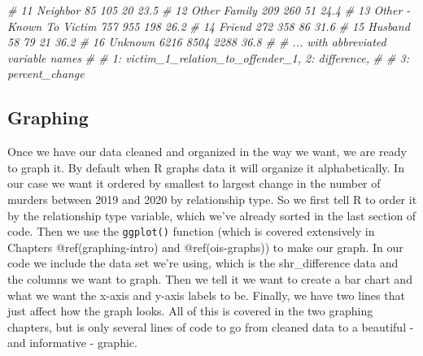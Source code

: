 \documentclass[
  a4paper,
]{krantz}
\makeatletter
\newenvironment{Shaded}{\begin{snugshade}}{\end{snugshade}}
\newcommand{\CommentTok}[1]{\textcolor[rgb]{0.56,0.35,0.01}{\textit{#1}}}
\newenvironment{kframe}{%
\medskip{}
\setlength{\fboxsep}{.8em}
 \def\at@end@of@kframe{}%
 \ifinner\ifhmode%
  \def\at@end@of@kframe{\end{minipage}}%
  \begin{minipage}{\columnwidth}%
 \fi\fi%
 \def\FrameCommand##1{\hskip\@totalleftmargin \hskip-\fboxsep
 \colorbox{shadecolor}{##1}\hskip-\fboxsep
     \hskip-\linewidth \hskip-\@totalleftmargin \hskip\columnwidth}%
 \MakeFramed {\advance\hsize-\width
   \@totalleftmargin\z@ \linewidth\hsize
   \@setminipage}}%
 {\par\unskip\endMakeFramed%
 \at@end@of@kframe}
\renewenvironment{Shaded}{\begin{kframe}}{\end{kframe}}
\makeatother
\begin{document}
\begin{Shaded}
\begin{Highlighting}[]
\CommentTok{\# 11 Neighbor                        85    105      20   23.5 }
\CommentTok{\# 12 Other Family                   209    260      51   24.4 }
\CommentTok{\# 13 Other {-} Known To Victim        757    955     198   26.2 }
\CommentTok{\# 14 Friend                         272    358      86   31.6 }
\CommentTok{\# 15 Husband                         58     79      21   36.2 }
\CommentTok{\# 16 Unknown                       6216   8504    2288   36.8 }
\CommentTok{\# \# ... with abbreviated variable names}
\CommentTok{\# \#   1: victim\_1\_relation\_to\_offender\_1, 2: difference,}
\CommentTok{\# \#   3: percent\_change}
\end{Highlighting}
\end{Shaded}

\hypertarget{graphing}{%
\subsection{Graphing}\label{graphing}}

Once we have our data cleaned and organized in the way we
want, we are ready to graph it. By default when R graphs
data it will organize it alphabetically. In our case we want
it ordered by smallest to largest change in the number of
murders between 2019 and 2020 by relationship type. So we
first tell R to order it by the relationship type variable,
which we've already sorted in the last section of code. Then
we use the \texttt{ggplot()} function (which is covered
extensively in Chapters @ref(graphing-intro) and
@ref(ois-graphs)) to make our graph. In our code we include
the data set we're using, which is the shr\_difference data
and the columns we want to graph. Then we tell it we want to
create a bar chart and what we want the x-axis and y-axis
labels to be. Finally, we have two lines that just affect
how the graph looks. All of this is covered in the two
graphing chapters, but is only several lines of code to go
from cleaned data to a beautiful - and informative -
graphic.
\end{document}
